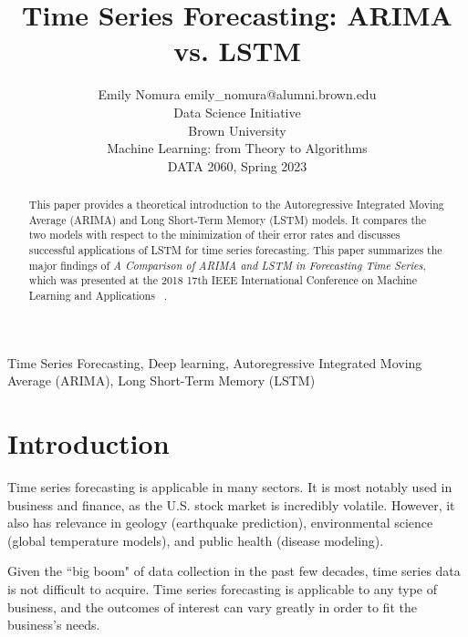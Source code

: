 \documentclass[twoside,11pt]{article}
\begin{document}
\title{Time Series Forecasting: ARIMA vs. LSTM}

\author{\name Emily Nomura \email emily\_nomura@alumni.brown.edu \\
       \addr Data Science Initiative\\
       Brown University\\
       Machine Learning: from Theory to Algorithms\\
       DATA 2060, Spring 2023\\
       }

\maketitle

\begin{abstract}%
This paper provides a theoretical introduction to the Autoregressive Integrated Moving Average (ARIMA) and Long Short-Term Memory (LSTM) models. It compares the two models with respect to the minimization of their error rates and discusses successful applications of LSTM for time series forecasting. This paper summarizes the major findings of \textit{A Comparison of ARIMA and LSTM in Forecasting Time Series}, which was presented at the 2018 17th IEEE International Conference on Machine Learning and Applications ~\citep{siami-namini:2018}.
\end{abstract}

\begin{keywords}
  Time Series Forecasting, Deep learning, Autoregressive Integrated Moving Average (ARIMA), Long Short-Term Memory (LSTM)
\end{keywords}

\section{Introduction}
Time series forecasting is applicable in many sectors. It is most notably used in business and finance, as the  U.S. stock market is incredibly volatile. However, it also has relevance in geology (earthquake prediction), environmental science (global temperature models), and public health (disease modeling).

Given the ``big boom" of data collection in the past few decades, time series data is not difficult to acquire. Time series forecasting is applicable to any type of business, and the outcomes of interest can vary greatly in order to fit the business's needs.
\end{document}
